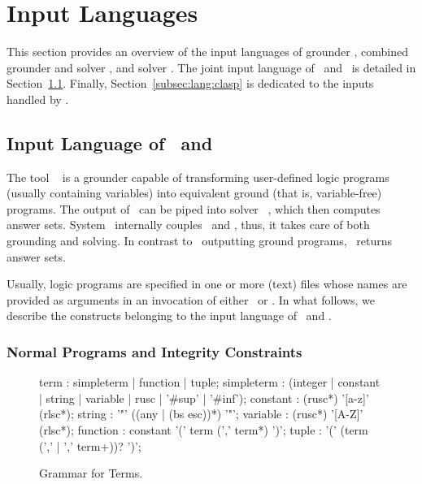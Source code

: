 \section{Input Languages}\label{sec:language}

This section provides an overview of the input languages of
grounder \gringo, combined grounder and solver \clingo, and solver \clasp.
The joint input language of \gringo\ and \clingo\ is detailed in
Section~\ref{subsec:lang:gringo}.
Finally, Section~\ref{subsec:lang:clasp} is dedicated to the inputs handled by \clasp.

\subsection{Input Language of \gringo\ and \clingo}\label{subsec:lang:gringo}

The tool \gringo~\cite{gescth07a} is a grounder capable of transforming
user-defined logic programs (usually containing variables) into
equivalent ground (that is, variable-free) programs.
The output of \gringo\ can be piped into solver \clasp~\cite{gekanesc07a,gekasc09c},
which then computes answer sets.
System \clingo\ internally couples \gringo\ and \clasp, thus,
it takes care of both grounding and solving.
In contrast to \gringo\ outputting ground programs,
\clingo\ returns answer sets.

Usually, logic programs are specified in one or more (text) files whose names are
provided as arguments in an invocation of either \gringo\ or \clingo.
In what follows, 
we describe the constructs belonging to the input language of \gringo\ and \clingo.

\subsubsection{Normal Programs and Integrity Constraints}\label{subsec:gringo:normal}

\begin{figure}
\railnontermfont{\rmfamily\itshape}%
\begin{rail}
  term        : simpleterm | function | tuple;
  simpleterm  : (integer | constant | string | variable | rusc | '\#sup' | '\#inf');
  constant    : (rusc*) '[a-z]' (rlsc*);
  string      : '"' ((any | (bs esc))*) '"';
  variable    : (rusc*) '[A-Z]' (rlsc*);
  function    : constant '(' term (',' term*) ')';
  tuple       :          '(' (term (',' | ',' term+))? ')';
\end{rail}
\caption{Grammar for Terms.\label{fig:terms}}
\end{figure}

